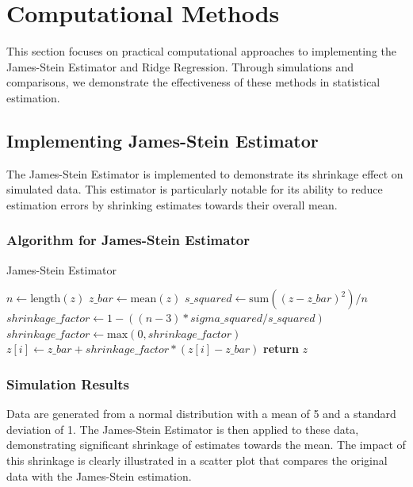 \section{Computational Methods}

This section focuses on practical computational approaches to implementing the James-Stein Estimator and Ridge Regression. Through simulations and comparisons, we demonstrate the effectiveness of these methods in statistical estimation.

\subsection{Implementing James-Stein Estimator}

The James-Stein Estimator is implemented to demonstrate its shrinkage effect on simulated data. This estimator is particularly notable for its ability to reduce estimation errors by shrinking estimates towards their overall mean.

\subsubsection{Algorithm for James-Stein Estimator}
\begin{algorithm}
\caption{James-Stein Estimator}
\begin{algorithmic}[1]
    \State $n \gets \text{length}(z)$
    \State $z\_bar \gets \text{mean}(z)$
    \State $s\_squared \gets \text{sum}((z - z\_bar)^2) / n$
    \State $shrinkage\_factor \gets 1 - ((n-3) * sigma\_squared / s\_squared)$
    \State $shrinkage\_factor \gets \text{max}(0, shrinkage\_factor)$
        \State $z[i] \gets z\_bar + shrinkage\_factor * (z[i] - z\_bar)$
    \EndFor
    \State \textbf{return} $z$
\EndProcedure
\end{algorithmic}
\end{algorithm}

\subsubsection{Simulation Results}

Data are generated from a normal distribution with a mean of 5 and a standard deviation of 1. The James-Stein Estimator is then applied to these data, demonstrating significant shrinkage of estimates towards the mean. The impact of this shrinkage is clearly illustrated in a scatter plot that compares the original data with the James-Stein estimation.

